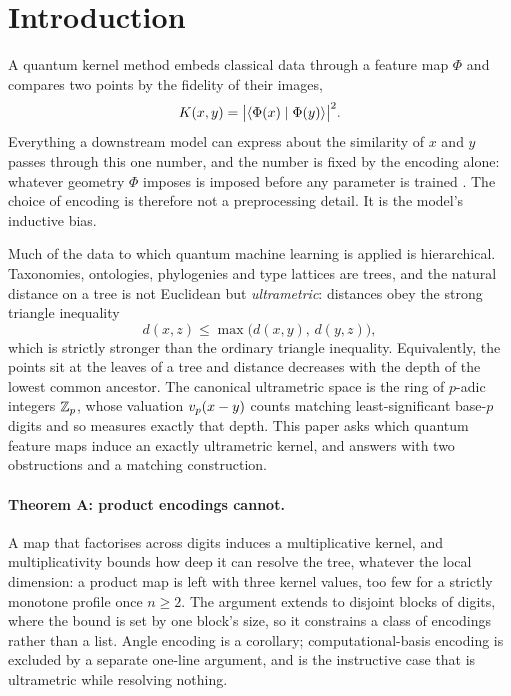\section{Introduction}
\label{sec:introduction}

A quantum kernel method embeds classical data through a feature map $\Phi$ and compares
two points by the fidelity of their images,
\begin{equation}
  \label{eq:fidelity-kernel}
  K(x, y) = \bigl\lvert\langle \Phi(x) \mid \Phi(y) \rangle\bigr\rvert^{2} .
\end{equation}
Everything a downstream model can express about the similarity of $x$ and $y$ passes
through this one number, and the number is fixed by the encoding alone: whatever
geometry $\Phi$ imposes is imposed before any parameter is trained
\citep{Schuld2021KernelMethods,HavlicekEtAl2019QuantumEnhanced}. The choice of encoding
is therefore not a preprocessing detail. It is the model's inductive bias.

Much of the data to which quantum machine learning is applied is hierarchical.
Taxonomies, ontologies, phylogenies and type lattices are trees, and the natural
distance on a tree is not Euclidean but \emph{ultrametric}: distances obey the strong
triangle inequality
\begin{equation}
  \label{eq:strong-triangle}
  d(x, z) \le \max\bigl(d(x, y),\, d(y, z)\bigr),
\end{equation}
which is strictly stronger than the ordinary triangle inequality. Equivalently, the
points sit at the leaves of a tree and distance decreases with the depth of the lowest
common ancestor. The canonical ultrametric space is the ring of $p$-adic integers
$\mathbb{Z}_p$, whose valuation $v_p(x - y)$ counts matching least-significant base-$p$ digits
and so measures exactly that depth. This paper asks which quantum feature maps induce an
exactly ultrametric kernel, and answers with two obstructions and a matching
construction.

\paragraph{Theorem A: product encodings cannot.}
A map that factorises across digits induces a multiplicative kernel, and
multiplicativity bounds how deep it can resolve the tree, whatever the local dimension:
a product map is left with three kernel values, too few for a strictly monotone profile
once $n \ge 2$. The argument extends to disjoint blocks of digits, where the bound is
set by one block's size, so it constrains a class of encodings rather than a list.
Angle encoding is a corollary; computational-basis encoding is excluded by a separate
one-line argument, and is the instructive case that is ultrametric while resolving
nothing.

